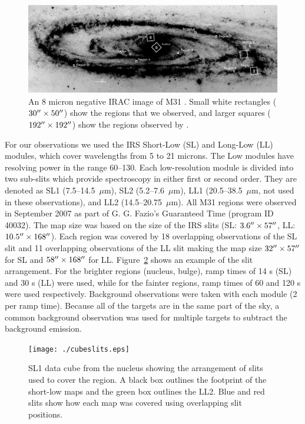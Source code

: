 \begin{figure}
\centering
\includegraphics[scale=0.9]{./m31_map.eps}
\caption{An 8 micron negative IRAC image of M31 \citep{Barmby2006lr}. Small white rectangles ($30\hbox{$^{\prime\prime}$}\times50\hbox{$^{\prime\prime}$}$) show the regions that we observed, and larger squares ($192\hbox{$^{\prime\prime}$}\times192\hbox{$^{\prime\prime}$}$) show the regions observed by  \citet{1998Cesarsky}.
\label{m31}
}
\end{figure}


For our observations we used the IRS Short-Low (SL) and Long-Low (LL) modules, which cover wavelengths from 5 to 21 microns. 
The Low modules have resolving power in the range 60--130. Each low-resolution module is divided into two sub-slits 
which provide spectroscopy in either first or second order. They are denoted as SL1 (7.5--14.5~$\mu$m), SL2 (5.2--7.6~$\mu$m),
LL1 (20.5--38.5~$\mu$m, not used in these observations), and LL2 (14.5--20.75~$\mu$m).
All M31 regions were observed in September 2007 as part of G. G. Fazio's Guaranteed Time (program ID 40032). 
The map size was based on the size 
of the IRS slits (SL: $3.6\hbox{$^{\prime\prime}$} \times 57\hbox{$^{\prime\prime}$}$, LL: $10.5\hbox{$^{\prime\prime}$} \times 168\hbox{$^{\prime\prime}$}$). Each region was covered by 18 overlapping observations 
of the SL slit and 11 overlapping observations of the LL slit making the map size $32\hbox{$^{\prime\prime}$} \times 57\hbox{$^{\prime\prime}$}$ for SL and $58\hbox{$^{\prime\prime}$} \times 168\hbox{$^{\prime\prime}$}$ for LL. 
Figure~\ref{slits} shows an example of the slit arrangement. For the brighter regions (nucleus, bulge), ramp times of 14 s (SL) and 30 s (LL) were used, 
while for the fainter regions, ramp times of 60 and 120 s were used respectively. Background observations were taken with each module (2 per ramp time). 
Because all of the targets are in the same part of the sky, a common background observation was used for multiple targets to subtract the background emission. 

\begin{figure}
\centering
\texttt{[image: ./cubeslits.eps]}
\caption{SL1 data cube from the nucleus showing the arrangement of slits used to cover the region. 
A black box outlines the footprint of the short-low maps and the green box outlines the LL2. Blue and red slits show how 
each map was covered using overlapping slit positions.
\label{slits}
}
\end{figure}

